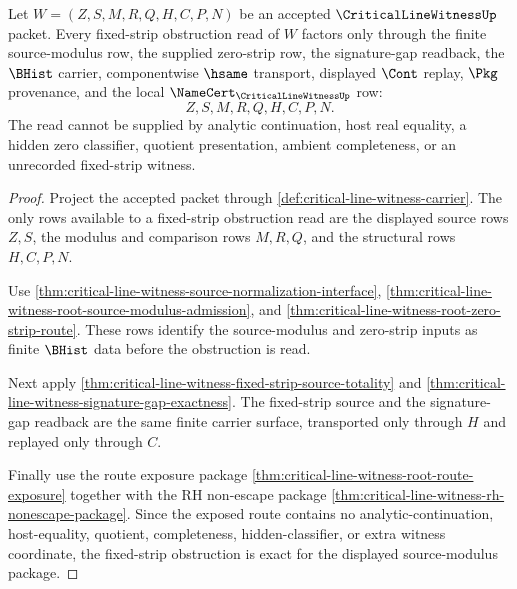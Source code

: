 \begin{theorem}
\label{thm:critical-line-witness-fixed-strip-obstruction-exactness}
Let $W=(Z,S,M,R,Q,H,C,P,N)$ be an accepted $\CriticalLineWitnessUp$ packet. Every fixed-strip obstruction read of $W$ factors only through the finite source-modulus row, the supplied zero-strip row, the signature-gap readback, the $\BHist$ carrier, componentwise $\hsame$ transport, displayed $\Cont$ replay, $\Pkg$ provenance, and the local $\NameCert_{\CriticalLineWitnessUp}$ row:
$$
Z,S,M,R,Q,H,C,P,N.
$$
The read cannot be supplied by analytic continuation, host real equality, a hidden zero classifier, quotient presentation, ambient completeness, or an unrecorded fixed-strip witness.
\end{theorem}
\begin{proof}
Project the accepted packet through \autoref{def:critical-line-witness-carrier}. The only rows available to a fixed-strip obstruction read are the displayed source rows $Z,S$, the modulus and comparison rows $M,R,Q$, and the structural rows $H,C,P,N$.

Use \autoref{thm:critical-line-witness-source-normalization-interface}, \autoref{thm:critical-line-witness-root-source-modulus-admission}, and \autoref{thm:critical-line-witness-root-zero-strip-route}. These rows identify the source-modulus and zero-strip inputs as finite $\BHist$ data before the obstruction is read.

Next apply \autoref{thm:critical-line-witness-fixed-strip-source-totality} and \autoref{thm:critical-line-witness-signature-gap-exactness}. The fixed-strip source and the signature-gap readback are the same finite carrier surface, transported only through $H$ and replayed only through $C$.

Finally use the route exposure package \autoref{thm:critical-line-witness-root-route-exposure} together with the RH non-escape package \autoref{thm:critical-line-witness-rh-nonescape-package}. Since the exposed route contains no analytic-continuation, host-equality, quotient, completeness, hidden-classifier, or extra witness coordinate, the fixed-strip obstruction is exact for the displayed source-modulus package.
\end{proof}

